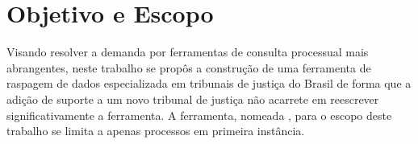 \section{Objetivo e Escopo}

Visando resolver a demanda por ferramentas de consulta processual mais
abrangentes, neste trabalho se propôs a construção de uma ferramenta de
raspagem de dados especializada em tribunais de justiça do Brasil de forma que
a adição de suporte a um novo tribunal de justiça não acarrete em reescrever
significativamente a ferramenta. A ferramenta, nomeada \textbf{\tjscraper},
para o escopo deste trabalho se limita a apenas processos em primeira
instância.


